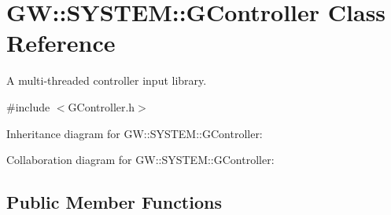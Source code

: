 \hypertarget{classGW_1_1SYSTEM_1_1GController}{}\section{GW\+::S\+Y\+S\+T\+EM\+::G\+Controller Class Reference}
\label{classGW_1_1SYSTEM_1_1GController}


A multi-\/threaded controller input library.  




{\ttfamily \#include $<$G\+Controller.\+h$>$}



Inheritance diagram for GW\+::S\+Y\+S\+T\+EM\+::G\+Controller\+:


Collaboration diagram for GW\+::S\+Y\+S\+T\+EM\+::G\+Controller\+:
\subsection*{Public Member Functions}
